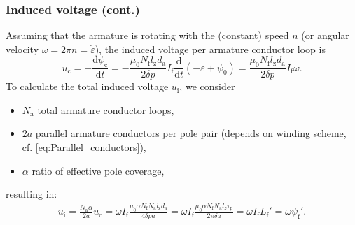 \begin{frame}
	\frametitle{Induced voltage (cont.)}
	 Assuming that the armature is rotating with the (constant) speed $n$ (or angular velocity $\omega = 2 \pi n=\dot{\varepsilon}$), the induced voltage per armature conductor loop is
	\begin{equation}
			u_\mathrm{c} = -\frac{\mathrm{d}\psi_\mathrm{c}}{\mathrm{d}t} = -\frac{\mu_0 N_\mathrm{f} l_\mathrm{z} d_\mathrm{a}}{2 \delta p} I_\mathrm{f} \frac{\mathrm{d}}{\mathrm{d}t}\left(-\varepsilon + \psi_{\mathrm{0}}\right)
			= \frac{\mu_0 N_\mathrm{f} l_\mathrm{z} d_\mathrm{a}}{2 \delta p} I_\mathrm{f} \omega.
		\label{eq:Induced_voltage_per_conductor}
	\end{equation}
	To calculate the total induced voltage $u_\mathrm{i}$, we consider
	\begin{itemize}
	   \item $N_\mathrm{a}$ total armature conductor loops, \pause
	   \item $2 a$ parallel armature conductors per pole pair (depends on winding scheme, cf. \eqref{eq:Parallel_conductors}), \pause
	   \item $\alpha$ ratio of effective pole coverage,
	\end{itemize}
	resulting in: \pause
	\begin{equation}
		\begin{split}
			u_\mathrm{i} = \frac{N_\mathrm{a}\alpha}{2 a} u_\mathrm{c} = \omega I_\mathrm{f}\frac{\mu_0 \alpha N_\mathrm{f} N_\mathrm{a} l_\mathrm{z} d_\mathrm{a}}{4 \delta p a} =  \omega I_\mathrm{f} \frac{\mu_0 \alpha N_\mathrm{f} N_\mathrm{a} l_z \tau_\mathrm{p}}{2 \pi  \delta a} =\omega I_\mathrm{f} L_\mathrm{f}' = \omega  \psi_\mathrm{f}'.
		\end{split}
	\end{equation}
\end{frame}

